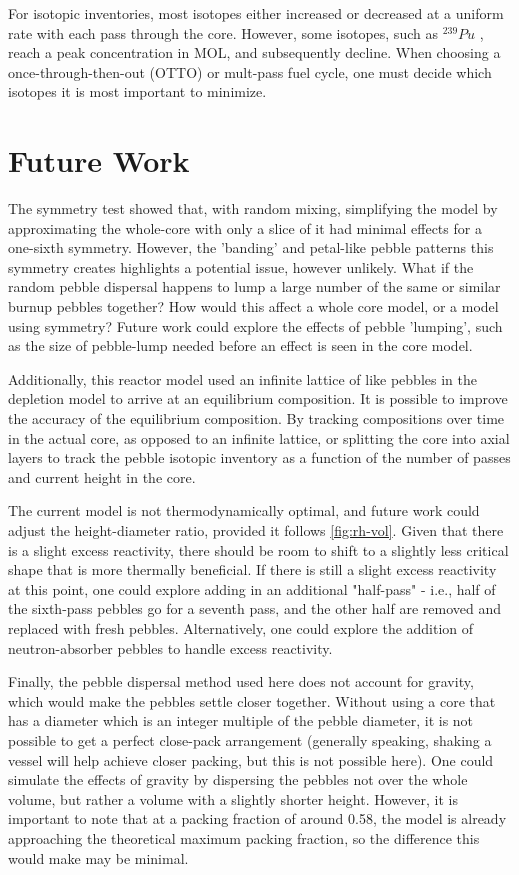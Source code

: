 For isotopic inventories, most isotopes either increased or decreased at a uniform rate with each pass through the core.  However, some isotopes, such as $^{239}Pu$ , reach a peak concentration in MOL, and subsequently decline.  When choosing a once-through-then-out (OTTO) or mult-pass fuel cycle, one must decide which isotopes it is most important to minimize.


\section{Future Work}

The symmetry test showed that, with random mixing, simplifying the model by approximating the whole-core with only a slice of it had minimal effects for a one-sixth symmetry.  However, the 'banding' and petal-like pebble patterns this symmetry creates highlights a potential issue, however unlikely.  What if the random pebble dispersal happens to lump a large number of the same or similar burnup pebbles together?  How would this affect a whole core model, or a model using symmetry?  Future work could explore the effects of pebble 'lumping', such as the size of pebble-lump needed before an effect is seen in the core model.

Additionally, this reactor model used an infinite lattice of like pebbles in the depletion model to arrive at an equilibrium composition.  It is possible to improve the accuracy of the equilibrium composition.  By tracking compositions over time in the actual core, as opposed to an infinite lattice, or splitting the core into axial layers to track the pebble isotopic inventory as a function of the number of passes and current height in the core.

The current model is not thermodynamically optimal, and future work could adjust the height-diameter ratio, provided it follows \ref{fig:rh-vol}.  Given that there is a slight excess reactivity, there should be room to shift to a slightly less critical shape that is more thermally beneficial.  If there is still a slight excess reactivity at this point, one could explore adding in an additional "half-pass" - i.e., half of the sixth-pass pebbles go for a seventh pass, and the other half are removed and replaced with fresh pebbles.  Alternatively, one could explore the addition of neutron-absorber pebbles to handle excess reactivity.

Finally, the pebble dispersal method used here does not account for gravity, which would make the pebbles settle closer together.  Without using a core that has a diameter which is an integer multiple of the pebble diameter, it is not possible to get a perfect close-pack arrangement (generally speaking, shaking a vessel will help achieve closer packing, but this is not possible here).  One could simulate the effects of gravity by dispersing the pebbles not over the whole volume, but rather a volume with a slightly shorter height.  However, it is important to note that at a packing fraction of around 0.58, the model is already approaching the theoretical maximum packing fraction, so the difference this would make may be minimal.